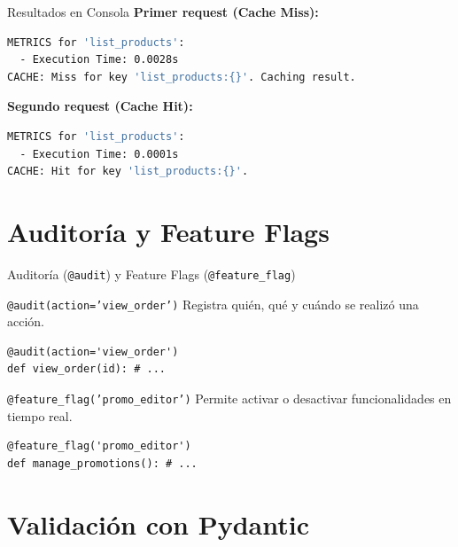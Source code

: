 \documentclass[spanish]{beamer}
\begin{document}
\begin{frame}[fragile]{Resultados en Consola}
    \textbf{Primer request (Cache Miss):}
    \begin{lstlisting}[language=bash]
METRICS for 'list_products':
  - Execution Time: 0.0028s
CACHE: Miss for key 'list_products:{}'. Caching result.
    \end{lstlisting}
    
    \vfill
    
    \textbf{Segundo request (Cache Hit):}
    \begin{lstlisting}[language=bash]
METRICS for 'list_products':
  - Execution Time: 0.0001s
CACHE: Hit for key 'list_products:{}'.
    \end{lstlisting}
\end{frame}

\section{Auditoría y Feature Flags}

\begin{frame}[fragile]{Auditoría (\texttt{@audit}) y Feature Flags (\texttt{@feature\_flag})}
    \begin{block}{\texttt{@audit(action='view\_order')}}
        Registra quién, qué y cuándo se realizó una acción.
    \end{block}
    \begin{lstlisting}
@audit(action='view_order')
def view_order(id): # ...
    \end{lstlisting}

    \begin{block}{\texttt{@feature\_flag('promo\_editor')}}
        Permite activar o desactivar funcionalidades en tiempo real.
    \end{block}
    \begin{lstlisting}
@feature_flag('promo_editor')
def manage_promotions(): # ...
    \end{lstlisting}
\end{frame}

\section{Validación con Pydantic}
\end{document}
